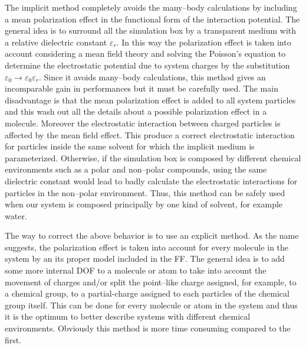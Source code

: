 The implicit method completely avoids the many--body calculations by including a mean polarization effect in the
functional form of the interaction potential. The general idea is to surround all the simulation box by a
transparent medium with a relative dielectric constant $\varepsilon_r$. In this way the polarization effect is
taken into account considering a mean field theory and solving the Poisson's equation to determine the
electrostatic potential due to system charges by the substitution
$\varepsilon_0\rightarrow\varepsilon_0\varepsilon_r$. Since it avoids many--body calculations, this method gives
an incomparable gain in performances but it must be carefully used. The main disadvantage is that the mean
polarization effect is added to all system particles and this wash out all the details about a possible
polarization effect in a molecule. Moreover the electrostatic interaction between charged particles is affected
by the mean field effect. This produce a correct electrostatic interaction for particles inside the same solvent
for which the implicit medium is parameterized. Otherwise, if the simulation box is composed by different
chemical environments such as a polar and non--polar compounds, using the same dielectric constant would lead to
badly calculate the electrostatic interactions for particles in the non--polar environment. Thus, this method can
be safely used when our system is composed principally by one kind of solvent, for example water.

The way to correct the above behavior is to use an explicit method. As the name suggests, the polarization effect
is taken into account for every molecule in the system by an its proper model included in the \ac{FF}. The
general idea is to add some more internal \ac{DOF} to a molecule or atom to take into account the movement of
charges and/or split the point--like charge assigned, for example, to a chemical group, to a partial-charge
assigned to each particles of the chemical group itself. This can be done for every molecule or atom in the
system and thus it is the optimum to better describe systems with different chemical environments. Obviously this
method is more time consuming compared to the first.

